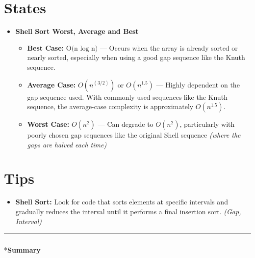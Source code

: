 \documentclass[
  letterpaper,
  DIV=11,
  numbers=noendperiod]{scrreprt}
\makeatletter
\let\oldsubparagraph\subparagraph
\renewcommand{\subparagraph}{
    \@ifstar
      \xxxSubParagraphStar
      \xxxSubParagraphNoStar
  }
\newcommand{\xxxSubParagraphStar}[1]{\oldsubparagraph*{#1}\mbox{}}
\newcommand{\xxxSubParagraphNoStar}[1]{\oldsubparagraph{#1}\mbox{}}
\providecommand{\tightlist}{%
  \setlength{\itemsep}{0pt}\setlength{\parskip}{0pt}}
\makeatother
\begin{document}
\section{States}

\begin{itemize}
\item
  \textbf{Shell Sort Worst, Average and Best}

  \begin{itemize}
  \tightlist
  \item
    \textbf{Best Case:} \(\text{O(n log n)}\) --- Occurs when the array
    is already sorted or nearly sorted, especially when using a good gap
    sequence like the Knuth sequence.
  \item
    \textbf{Average Case:} \(O(n^(3/2))\) or \(O(n^1.5)\) --- Highly
    dependent on the gap sequence used. With commonly used sequences
    like the Knuth sequence, the average-case complexity is
    approximately \(O(n^1.5)\).
  \item
    \textbf{Worst Case:} \({O(n^2)}\) --- Can degrade to \({O(n^2)}\),
    particularly with poorly chosen gap sequences like the original
    Shell sequence \emph{(where the gaps are halved each time)}
  \end{itemize}
\end{itemize}

\section{Tips}

\begin{itemize}
\tightlist
\item
  \textbf{Shell Sort:} Look for code that sorts elements at specific
  intervals and gradually reduces the interval until it performs a final
  insertion sort. \emph{(Gap, Interval)}
\end{itemize}

\begin{center}\rule{0.5\linewidth}{0.5pt}\end{center}

\subparagraph*{\texorpdfstring{\textbf{Summary}}{Summary}}\label{summary}
\end{document}
